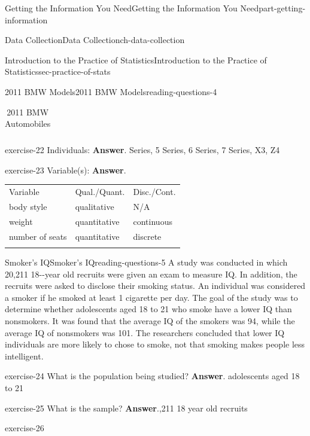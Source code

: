 \documentclass[oneside,10pt,]{book}
\numberwithin{equation}{section}
\newcommand{\hrulemedium}{\noalign{\hrule height 0.07em}}
\newcommand{\hrulethick} {\noalign{\hrule height 0.11em}}
\begin{document}
\begin{partptx}{Getting the Information You Need}{}{Getting the Information You Need}{}{}{part-getting-information}
\begin{chapterptx}{Data Collection}{}{Data Collection}{}{}{ch-data-collection}
\begin{sectionptx}{Introduction to the Practice of Statistics}{}{Introduction to the Practice of Statistics}{}{}{sec-practice-of-stats}
\begin{reading-questions-subsection-numberless}{2011 BMW Models}{}{2011 BMW Models}{}{}{reading-questions-4}
\begin{table}
\begin{tabular}{llll}
\end{tabular}
\caption{2011 BMW Automobiles\label{table-1}}
\end{table}
\begin{divisionexercise}{1}{}{}{exercise-22}%
Individuals: \textbf{Answer}.\hypertarget{answer-22}{} Series, 5 Series, 6 Series, 7 Series, X3, Z4\end{divisionexercise}%
\begin{divisionexercise}{2}{}{}{exercise-23}%
Variable(s): \textbf{Answer}.\hypertarget{answer-23}{}\quad%
\begin{tabular}{lll}\hrulethick
Variable&Qual.\slash{}Quant.&Disc.\slash{}Cont.\tabularnewline\hrulemedium
body style&qualitative&N\slash{}A\tabularnewline[0pt]
weight&quantitative&continuous\tabularnewline[0pt]
number of seats&quantitative&discrete\tabularnewline\hrulethick
\end{tabular}
\end{divisionexercise}%
\end{reading-questions-subsection-numberless}
%
%
\typeout{************************************************}
\typeout{************************************************}
%
\begin{reading-questions-subsection-numberless}{Smoker's IQ}{}{Smoker's IQ}{}{}{reading-questions-5}
\hypertarget{p-5}{}%
A study was conducted in which 20,211 18-{}-{}year old recruits were given an exam to measure IQ. In addition, the recruits were asked to disclose their smoking status. An individual was considered a smoker if he smoked at least 1 cigarette per day. The goal of the study was to determine whether adolescents aged 18 to 21 who smoke have a lower IQ than nonsmokers. It was found that the average IQ of the smokers was 94, while the average IQ of nonsmokers was 101. The researchers concluded that lower IQ individuals are more likely to chose to smoke, not that smoking makes people less intelligent.%
\begin{divisionexercise}{1}{}{}{exercise-24}%
What is the population being studied? \textbf{Answer}.\hypertarget{answer-24}{}\quad%
adolescents aged 18 to 21\end{divisionexercise}%
\begin{divisionexercise}{2}{}{}{exercise-25}%
What is the sample? \textbf{Answer}.\hypertarget{answer-25}{},211 18 year old recruits\end{divisionexercise}%
\begin{divisionexercise}{3}{}{}{exercise-26}%

\end{divisionexercise}
\end{reading-questions-subsection-numberless}
\end{sectionptx}
\end{chapterptx}
\end{partptx}
\end{document}
